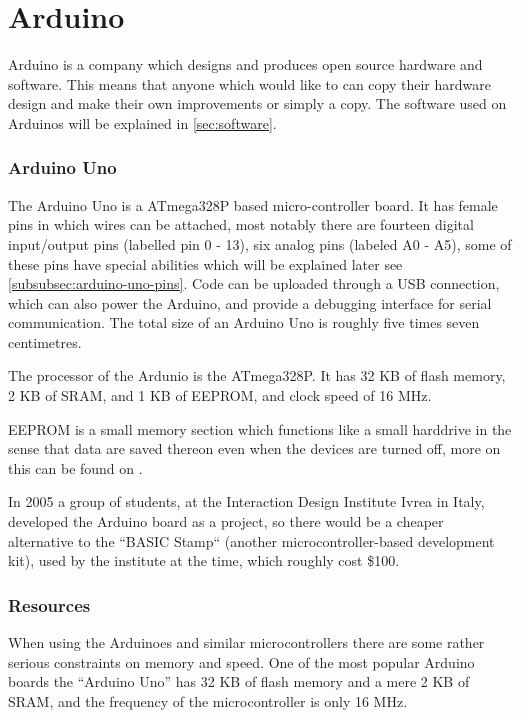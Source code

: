 
\section{Arduino}
Arduino is a company which designs and produces open source hardware and software.
This means that anyone which would like to can copy their hardware design and make their own improvements or simply a copy.
The software used on Arduinos will be explained in \ref{sec:software}.

\subsubsection{Arduino Uno}
The Arduino Uno is a ATmega328P based micro-controller board.
It has female pins in which wires can be attached, most notably there are fourteen digital input/output pins (labelled pin 0 - 13), six analog pins (labeled A0 - A5), some of these pins have special abilities which will be explained later see \ref{subsubsec:arduino-uno-pins}.
Code can be uploaded through a USB connection, which can also power the Arduino, and provide a debugging interface for serial communication.
The total size of an Arduino Uno is roughly five times seven centimetres. 

The processor of the Ardunio is the ATmega328P.
It has 32 KB of flash memory, 2 KB of SRAM, and 1 KB of EEPROM, and clock speed of 16 MHz.

EEPROM is a small memory section which functions like a small harddrive in the sense that data are saved thereon even when the devices are turned off, more on this can be found on \cite{EEPROM}.

\begin{tcolorbox}[floatplacement=b,float,colback=white!5,colframe=aaublue!50,title=The Birth of the Arduino]
In 2005 a group of students, at the Interaction Design Institute Ivrea in Italy, developed the Arduino board as a project, so there would be a cheaper alternative to the ``BASIC Stamp`` (another microcontroller-based development kit), used by the institute at the time, which roughly cost \$100. \cite{birthofarduino}
\end{tcolorbox}

\subsubsection{Resources}
When using the Arduinoes and similar microcontrollers there are some rather serious constraints on memory and speed.
One of the most popular Arduino boards the ``Arduino Uno'' has 32 KB of flash memory and a mere 2 KB of SRAM, and the frequency of the microcontroller is only 16 MHz.

